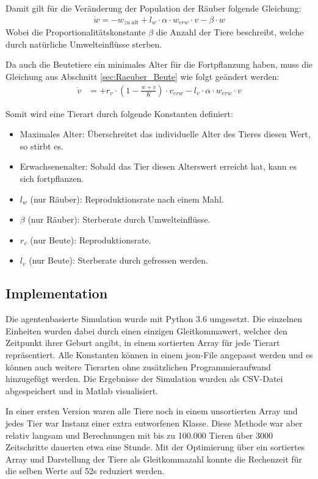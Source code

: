 \documentclass[a4paper,twoside]{article}
\begin{document}
	Damit gilt für die Veränderung der Population der Räuber folgende Gleichung:
	\begin{align*}
		\dot{w} = -w_{zu~alt} + l_w \cdot \alpha \cdot w_{erw} \cdot v - \beta \cdot w
	\end{align*}
	Wobei die Proportionalitätskonstante \(\beta\) die Anzahl der Tiere beschreibt, welche durch natürliche Umwelteinflüsse sterben.

	Da auch die Beutetiere ein minimales Alter für die Fortpflanzung haben, muss die Gleichung aus Abschnitt \ref{sec:Raeuber_Beute} wie folgt geändert werden:
	\begin{align*}
		\dot{v} &= +r_v \cdot \left(1 - \frac{w+v}{K} \right) \cdot v_{erw} - l_v \cdot \alpha \cdot w_{erw} \cdot v
	\end{align*}
	
		Somit wird eine Tierart durch folgende Konstanten definiert:
	\begin{itemize}
	\item Maximales Alter: Überschreitet das individuelle Alter des Tieres diesen Wert, so stirbt es.\\
	\item Erwachsenenalter: Sobald das Tier diesen Alterswert erreicht hat, kann es sich fortpflanzen. \\
	\item \(l_w\) (nur Räuber): Reproduktionsrate nach einem Mahl.
	\item \(\beta\) (nur Räuber): Sterberate durch Umwelteinflüsse.
	\item \(r_v\) (nur Beute): Reproduktionsrate.
	\item \(l_v\) (nur Beute): Sterberate durch gefressen werden.
	\end{itemize}
	\subsection{Implementation}
	Die agentenbasierte Simulation wurde mit Python 3.6 umgesetzt. Die einzelnen Einheiten wurden dabei durch einen einzigen Gleitkommawert, welcher den Zeitpunkt ihrer Geburt angibt, in einem sortierten Array für jede Tierart repräsentiert. Alle Konstanten können in einem json-File angepasst werden und es können auch weitere Tierarten ohne zusätzlichen Programmieraufwand hinzugefügt werden. Die Ergebnisse der Simulation wurden als CSV-Datei abgespeichert und in Matlab visualisiert.
	
	In einer ersten Version waren alle Tiere noch in einem unsortierten Array und jedes Tier war Instanz einer extra entworfenen Klasse. Diese Methode war aber relativ langsam und  Berechnungen mit bis zu 100.000 Tieren über 3000 Zeitschritte dauerten etwa eine Stunde. Mit der Optimierung über ein sortiertes Array und Darstellung der Tiere als Gleitkommazahl konnte die Rechenzeit für die selben Werte auf 52s reduziert werden.
	
\end{document}
